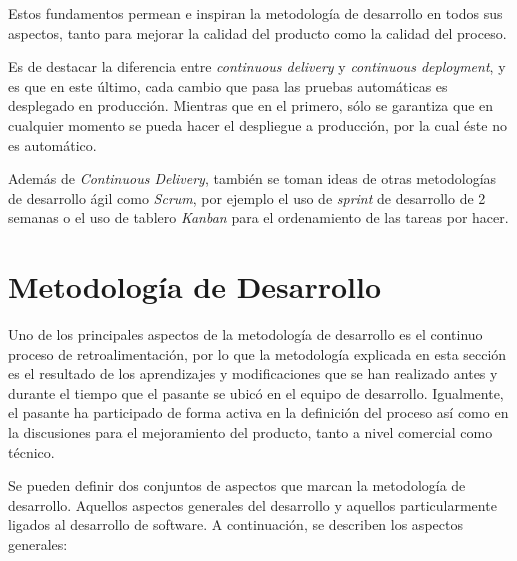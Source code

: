 Estos fundamentos permean e inspiran la metodología de desarrollo en todos sus aspectos, tanto para mejorar la calidad del producto como la calidad del proceso.

Es de destacar la diferencia entre \textit{continuous delivery} y \textit{continuous deployment}, y es que en este último, cada cambio que pasa las pruebas automáticas es desplegado en producción. Mientras que en el primero, sólo se garantiza que en cualquier momento se pueda hacer el despliegue a producción, por la cual éste no es automático.

Además de \textit{Continuous Delivery}, también se toman ideas de otras metodologías de desarrollo ágil como \textit{Scrum}, por ejemplo el uso de \textit{sprint} de desarrollo de 2 semanas o el uso de tablero \textit{Kanban} para el ordenamiento de las tareas por hacer.

\section{Metodología de Desarrollo}

Uno de los principales aspectos de la metodología de desarrollo es el continuo proceso de retroalimentación, por lo que la metodología explicada en esta sección es el resultado de los aprendizajes y modificaciones que se han realizado antes y durante el tiempo que el pasante se ubicó en el equipo de desarrollo. Igualmente, el pasante ha participado de forma activa en la definición del proceso así como en la discusiones para el mejoramiento del producto, tanto a nivel comercial como técnico.

Se pueden definir dos conjuntos de aspectos que marcan la metodología de desarrollo. Aquellos aspectos generales del desarrollo y aquellos particularmente ligados al desarrollo de software. A continuación, se describen los aspectos generales:

